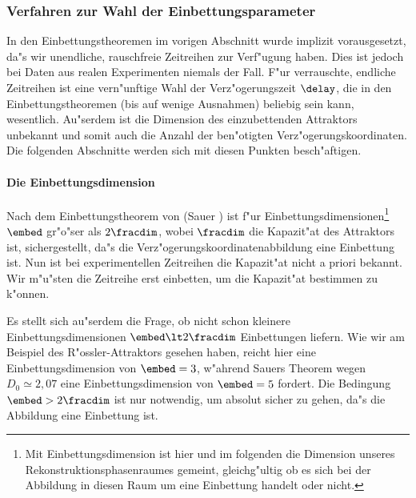 
\subsubsection{Verfahren zur Wahl der Einbettungsparameter}
\label{chapparams}
In den Einbettungstheoremen im vorigen Abschnitt wurde implizit vorausgesetzt, da"s wir
unendliche, rauschfreie Zeitreihen zur Verf"ugung haben. Dies ist jedoch bei Daten aus
realen Experimenten niemals der Fall. F"ur verrauschte, endliche Zeitreihen ist eine
vern"unftige Wahl der Verz"ogerungszeit $\delay$, die in den Einbettungstheoremen (bis auf
wenige Ausnahmen) beliebig sein kann, wesentlich. Au"serdem ist die Dimension des
einzubettenden Attraktors unbekannt und somit auch die Anzahl der ben"otigten
Verz"ogerungskoordinaten. Die folgenden Abschnitte werden sich mit diesen Punkten
besch"aftigen.


\paragraph{Die Einbettungsdimension}

Nach  dem Einbettungstheorem von \autor(Sauer \etal)  ist f"ur Einbettungsdimensionen\footnote{Mit
  Einbettungsdimension ist hier und im folgenden die Dimension unseres
  Rekonstruktionsphasenraumes gemeint, gleichg"ultig ob es sich bei der Abbildung in
  diesen Raum um eine Einbettung handelt oder nicht.} $\embed$ gr"o"ser als $2\fracdim$,
wobei $\fracdim$ die Kapazit"at des Attraktors ist, sichergestellt, da"s die
Verz"ogerungskoordinatenabbildung eine Einbettung ist. Nun ist bei experimentellen
Zeitreihen die Kapazit"at nicht a priori bekannt. Wir m"u"sten die Zeitreihe erst
einbetten, um die Kapazit"at bestimmen zu k"onnen.

Es stellt sich au"serdem die Frage, ob nicht schon kleinere Einbettungsdimensionen
$\embed\lt 2\fracdim$ Einbettungen liefern. Wie wir am Beispiel des R"ossler-Attraktors
gesehen haben, reicht hier eine Einbettungsdimension von $\embed=3$, w"ahrend Sauers
Theorem wegen $D_0\simeq2,07$ eine Einbettungsdimension von $\embed=5$ fordert. Die
Bedingung $\embed>2\fracdim$ ist nur notwendig, um absolut sicher zu gehen, da"s die
Abbildung eine Einbettung ist.

